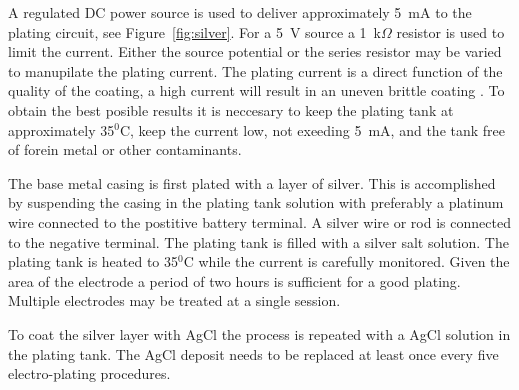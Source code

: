 A regulated DC power source is used to deliver approximately 5~mA to
the plating circuit, see Figure~\vref{fig:silver}. For a 5~V source a
1~k$\Omega$ resistor is used to limit the current. Either the source
potential or the series resistor may be varied to manupilate the
plating current. The plating current is a direct function of the
quality of the coating, a high current will result in an uneven
brittle coating \cite{eeghand}. To obtain the best posible results it
is neccesary to keep the plating tank at approximately 35$^0$C, keep
the current low, not exeeding 5~mA, and the tank free of forein metal
or other contaminants.

The base metal casing is first plated with a layer of silver. This is
accomplished by suspending the casing in the plating tank solution
with preferably a platinum wire connected to the postitive battery
terminal. A silver wire or rod is connected to the negative
terminal. The plating tank is filled with a silver salt solution. The
plating tank is heated to 35$^0$C while the current is carefully
monitored. Given the area of the electrode a period of two hours is
sufficient for a good plating. Multiple electrodes may be treated at a
single session.

To coat the silver layer with AgCl the process is repeated with a AgCl
solution in the plating tank. The AgCl deposit needs to be replaced at
least once every five electro-plating procedures.


